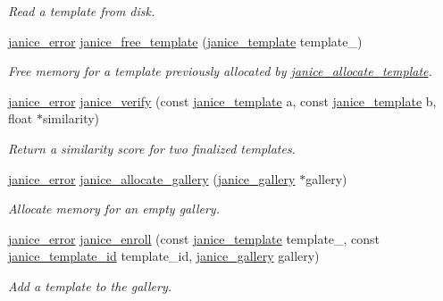\begin{DoxyCompactItemize}
\begin{DoxyCompactList}\small\item\em Read a template from disk. \end{DoxyCompactList}\item 
\hyperlink{group__janice_ga4873d49c1f9d6a6880dfbd485cf6ba72}{janice\+\_\+error} \hyperlink{group__janice_ga5fa70d9ddc0b9b74e9be28cd4772be9a}{janice\+\_\+free\+\_\+template} (\hyperlink{group__janice_ga5593b06e86b90504968c0fc191ee2f3c}{janice\+\_\+template} template\+\_\+)
\begin{DoxyCompactList}\small\item\em Free memory for a template previously allocated by \hyperlink{group__janice_ga5709bc7f0fd329db20f72cac8639c328}{janice\+\_\+allocate\+\_\+template}. \end{DoxyCompactList}\item 
\hyperlink{group__janice_ga4873d49c1f9d6a6880dfbd485cf6ba72}{janice\+\_\+error} \hyperlink{group__janice_gafdbbe1f5e6346e5e84be26192e4561ac}{janice\+\_\+verify} (const \hyperlink{group__janice_ga5593b06e86b90504968c0fc191ee2f3c}{janice\+\_\+template} a, const \hyperlink{group__janice_ga5593b06e86b90504968c0fc191ee2f3c}{janice\+\_\+template} b, float $\ast$similarity)
\begin{DoxyCompactList}\small\item\em Return a similarity score for two finalized templates. \end{DoxyCompactList}\item 
\hyperlink{group__janice_ga4873d49c1f9d6a6880dfbd485cf6ba72}{janice\+\_\+error} \hyperlink{group__janice_gad17bd59e58177b5f29f32f418ce77f71}{janice\+\_\+allocate\+\_\+gallery} (\hyperlink{group__janice_ga08feff1c2835b44332afeda80c3d0fb7}{janice\+\_\+gallery} $\ast$gallery)
\begin{DoxyCompactList}\small\item\em Allocate memory for an empty gallery. \end{DoxyCompactList}\item 
\hyperlink{group__janice_ga4873d49c1f9d6a6880dfbd485cf6ba72}{janice\+\_\+error} \hyperlink{group__janice_gae853da58f37454ddc14316da24543565}{janice\+\_\+enroll} (const \hyperlink{group__janice_ga5593b06e86b90504968c0fc191ee2f3c}{janice\+\_\+template} template\+\_\+, const \hyperlink{group__janice_ga5ec62465fbbc7a92faadfefd3d20e25b}{janice\+\_\+template\+\_\+id} template\+\_\+id, \hyperlink{group__janice_ga08feff1c2835b44332afeda80c3d0fb7}{janice\+\_\+gallery} gallery)
\begin{DoxyCompactList}\small\item\em Add a template to the gallery. \end{DoxyCompactList}\item 

\end{DoxyCompactItemize}
